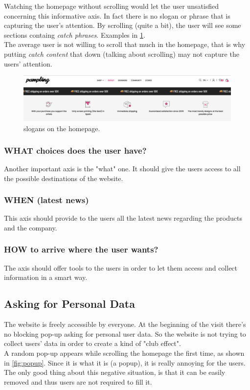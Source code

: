 Watching the homepage without scrolling would let the user unsatisfied concerning this informative axis. 
In fact there is no slogan or phrase that is capturing the user's attention. 
By scrolling (quite a bit), the user will see some sections containg \textit{catch phrases}. 
Examples in \cref{fig:slogan}.\\
The average user is not willing to scroll that much in the homepage, that is why putting \textit{catch content} that down (talking about scrolling) may not capture the users' attention.

\begin{figure}[h!]
	\centering
	\includegraphics[scale=0.225]{images/slogan.png}
	\caption{slogans on the homepage.}
	\label{fig:slogan}
\end{figure}

\subsubsection{WHAT choices does the user have?} 
Another important axis is the "what" one. It should give the users access to all the possible destinations of the website.\\



\subsubsection{WHEN (latest news)} 
This axis should provide to the users all the latest news regarding the products and the company.\\


\subsubsection{HOW to arrive where the user wants?} 
The axis should offer tools to the users in order to let them access and collect information in a smart way.\\


\subsection{Asking for Personal Data}
The website is freely accessible by everyone. At the beginning of the visit there's no blocking pop-up asking for personal user data. So the website is not trying to collect users' data in order to create a kind of "club effect".\\
A random pop-up appears while scrolling the homepage the first time, as shown in \cref{fig:popup}. Since it is what it is (a popup), it is really annoying for the users. The only good thing about this negative situation, is that it can be easily removed and thus users are not required to fill it.


